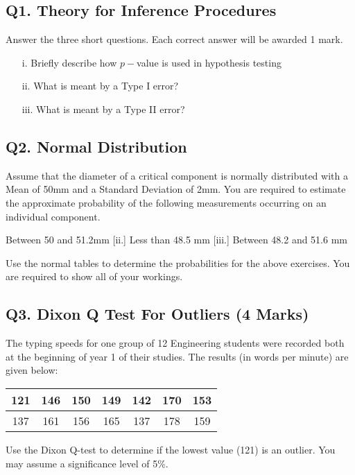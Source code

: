 
\subsection*{Q1. Theory for Inference Procedures }
Answer the three short questions. Each correct answer will be awarded 1 mark.
\begin{itemize}
\item[i.] Briefly describe how $p-$value is used in hypothesis testing
\item[ii.] What is meant by a Type I error?
\item[iii.] What is meant by a Type II error?
\end{itemize}


\subsection*{Q2. Normal Distribution } %
Assume that the diameter of a critical component is normally distributed with a Mean of 50mm and a Standard Deviation of 2mm. 
You are required  to estimate the approximate probability of the following measurements occurring on an individual component.
\begin{itemize}
 [i.]	Between 50 and 51.2mm
 [ii.] Less than 48.5 mm
 [iii.] Between 48.2 and 51.6 mm
\end{itemize}

\noindent Use the normal tables to determine the probabilities for the above exercises. You are required to show all of your workings.

\subsection*{Q3. Dixon Q Test For Outliers (4 Marks)}

The typing speeds for one group of 12 Engineering students were recorded both at the beginning of year 1 of their studies. The results (in words per minute) are given below:

\begin{center}
\begin{tabular}{|c|c|c|c|c|c|c|}
\hline
121 & 146 & 150 &149 &142 &170& 153\\ \hline
 137 & 161 & 156& 165& 137& 178& 159
\\ \hline
\end{tabular}
\end{center}
Use the Dixon Q-test to determine if the lowest value (121) is an outlier. You may assume a significance level of 5\%.


